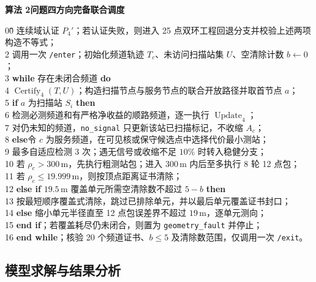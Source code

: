 \begin{mdframed}[
  nobreak=true,
  linewidth=0.6pt,
  innerleftmargin=7pt,
  innerrightmargin=7pt,
  innertopmargin=5pt,
  innerbottommargin=2pt,
  skipabove=6pt,
  skipbelow=6pt
]
\textbf{算法 2\quad 问题四方向完备联合调度}
\begin{tabbing}
00\quad\=\quad\quad\=\quad\quad\=\quad\quad\= \> 连续域认证 $P_4'$；若认证失败，则进入 25 点双环工程回退分支并校验上述两项构造不等式；\\
2 \> 调用一次 \texttt{/enter}；初始化频道轨迹 $T_c$、未访问扫描站集 $U$、空清除计数 $b\leftarrow0$；\\
3 \> \textbf{while} 存在未闭合频道 \textbf{do}\\
4 \>\> $\operatorname{Certify}_4(T,U)$；构造扫描节点与服务节点的联合开放路径并取首节点 $a$；\\
5 \>\> \textbf{if} $a$ 为扫描站 $S_i$ \textbf{then}\\
6 \>\>\> 检测必测频道和有严格净收益的顺路频道，逐一执行 $\operatorname{Update}_4$；\\
7 \>\>\> 对仍未知的频道，\texttt{no\_signal} 只更新该站已扫描标记，不收缩 $A_c$；\\
8 \>\> \textbf{else}\quad 令 $c$ 为服务频道，在可见核或保守候选点中选择代价最小测站；\\
9 \>\>\> 最多自适应检测 3 次；遇无信号或收缩不足 $10\%$ 时转入稳健分支；\\
10\>\>\> 若 $\rho_c>300\,\mathrm m$，先执行粗测站包；进入 $300\,\mathrm m$ 内后至多执行 8 轮 12 点包；\\
11\>\>\> 若 $\rho_c\le19.999\,\mathrm m$，则按顶点距离证书清除；\\
12\>\>\> \textbf{else if} $19.5\,\mathrm m$ 覆盖单元所需空清除数不超过 $5-b$ \textbf{then}\\
13\>\>\>\> 按最短顺序覆盖式清除，跳过已排除单元，并以最后单元覆盖证书封口；\\
14\>\>\> \textbf{else} 缩小单元半径直至 12 点包误差界不超过 $19\,\mathrm m$，逐单元测向；\\
15\>\> \textbf{end if}；若覆盖耗尽仍未闭合，则置为 \texttt{geometry\_fault} 并停止；\\
16\> \textbf{end while}；核验 20 个频道证书、$b\le5$ 及清除数范围，仅调用一次 \texttt{/exit}。
\end{tabbing}
\end{mdframed}

\subsection{模型求解与结果分析}

